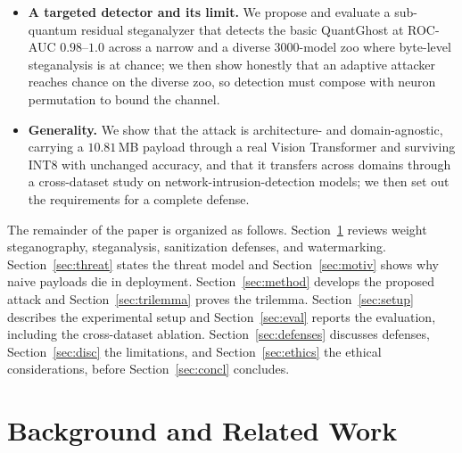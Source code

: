 \documentclass[a4paper,fleqn]{cas-dc}
\theoremstyle{plain}
\theoremstyle{remark}
\newcommand{\sys}{\mbox{QuantGhost}}
\begin{document}
\begin{itemize}
  an out-of-band ciphertext byte-exactly. We are explicit that what survives permutation is
  this bootstrap key channel rather than the in-weight payload, which is already enough to
  make permutation-based sanitization incomplete.
\item \textbf{A targeted detector and its limit.} We propose and evaluate a sub-quantum
  residual steganalyzer that detects the basic \sys{} at ROC-AUC $0.98$--$1.0$ across a
  narrow and a diverse $3000$-model zoo where byte-level steganalysis is at chance; we then
  show honestly that an adaptive attacker reaches chance on the diverse zoo, so detection
  must compose with neuron permutation to bound the channel.
\item \textbf{Generality.} We show that the attack is architecture- and domain-agnostic,
  carrying a $10.81$\,MB payload through a real Vision Transformer and surviving INT8 with
  unchanged accuracy, and that it transfers across domains through a cross-dataset study on
  network-intrusion-detection models; we then set out the requirements for a complete defense.
\end{itemize}

The remainder of the paper is organized as follows. Section~\ref{sec:related} reviews
weight steganography, steganalysis, sanitization defenses, and watermarking.
Section~\ref{sec:threat} states the threat model and Section~\ref{sec:motiv} shows why
naive payloads die in deployment. Section~\ref{sec:method} develops the proposed attack
and Section~\ref{sec:trilemma} proves the trilemma. Section~\ref{sec:setup} describes
the experimental setup and Section~\ref{sec:eval} reports the evaluation, including the
cross-dataset ablation. Section~\ref{sec:defenses} discusses defenses,
Section~\ref{sec:disc} the limitations, and Section~\ref{sec:ethics} the ethical
considerations, before Section~\ref{sec:concl} concludes.

\section{Background and Related Work}\label{sec:related}
\end{document}

